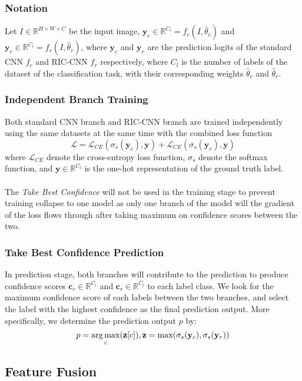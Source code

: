 \subsubsection{Notation}
Let $I \in \mathbb{R}^{H \times W \times C}$ be the input image, $\mathbf{y}_c \in \mathbb{R}^{C_l} = f_c(I, \hat{\theta}_c)$ and $\mathbf{y}_r \in \mathbb{R}^{C_l} = f_r(I, \hat{\theta}_r)$, where $\mathbf{y}_c$ and $\mathbf{y}_r$ are the prediction logits of the standard CNN $f_c$ and RIC-CNN $f_r$ respectively, where $C_l$ is the number of labels of the dataset of the classification task, with their corresponding weights $\hat{\theta}_c$ and $\hat{\theta}_r$.

\subsubsection{Independent Branch Training}
Both standard CNN branch and RIC-CNN branch are trained independently using the same datasets at the same time with the combined loss function
$$
\mathcal{L} = \mathcal{L}_{CE}(\sigma_s(\mathbf{y}_c), \mathbf{y}) + \mathcal{L}_{CE}(\sigma_s(\mathbf{y}_r), \mathbf{y})
$$
where $\mathcal{L}_{CE}$ denote the cross-entropy loss function, $\sigma_s$ denote the softmax function, and $\mathbf{y} \in \mathbb{R}^{C_l}$ is the one-hot representation of the ground truth label.
\\ \\
The \textit{Take Best Confidence} will not be used in the training stage to prevent training collapse to one model as only one branch of the model will the gradient of the loss flows through after taking maximum on confidence scores between the two.

\subsubsection{Take Best Confidence Prediction}
In prediction stage, both branches will contribute to the prediction to produce confidence scores $\mathbf{c}_c \in \mathbb{R}^{C_l}$ and $\mathbf{c}_r \in \mathbb{R}^{C_l}$ to each label class. We look for the maximum confidence score of each labels between the two branches, and select the label with the highest confidence as the final prediction output.
More specifically, we determine the prediction output $p$ by:
$$
p = \operatorname*{arg\,max}_c(\mathbf{z}[c]), \mathbf{z} = \max(\sigma_s(\mathbf{y}_c), \sigma_s(\mathbf{y}_r))
$$
\subsection{Feature Fusion}

